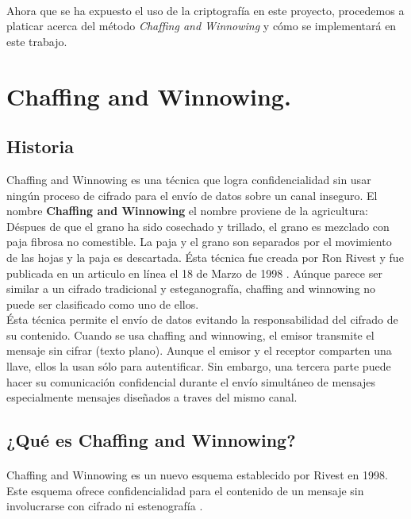\documentclass[12pt, a4paper, titlepage]{report}
\begin{document}
	    \paragraph{}
	    Ahora que se ha expuesto el uso de la criptografía en este proyecto, procedemos a platicar acerca del método \textit{Chaffing and Winnowing} y cómo se implementará en este trabajo.
	   
	    \section{Chaffing and Winnowing.}
	    \subsection{Historia}
	    Chaffing and Winnowing es una técnica que logra confidencialidad sin usar ning\'un proceso de cifrado para el env\'io de datos sobre un canal inseguro. El nombre \textbf{Chaffing and Winnowing} el nombre proviene de la agricultura: D\'espues de que el grano ha sido cosechado y trillado, el grano es mezclado con paja fibrosa no comestible. La paja y el grano son separados por el movimiento de las hojas y la paja es descartada.
	    \'Esta t\'ecnica fue creada por Ron Rivest y fue publicada en un articulo en l\'inea el 18 de Marzo de 1998 \cite{refCryptohraphyWithoutEncryption}.
	    A\'unque parece ser similar a un cifrado tradicional y esteganograf\'ia, chaffing and winnowing no puede ser clasificado como uno de ellos.\\
	    \'Esta t\'ecnica permite el env\'io de datos evitando la responsabilidad del cifrado de su contenido. Cuando se usa chaffing and winnowing, el emisor transmite el mensaje sin cifrar (texto plano). Aunque el emisor y el receptor comparten una llave, ellos la usan s\'olo para autentificar. Sin embargo, una tercera parte puede hacer su comunicaci\'on confidencial durante el env\'io simult\'aneo de mensajes especialmente mensajes diseñados a traves del mismo canal.
	    
	    \subsection{¿Qu\'e es Chaffing and Winnowing?}
	    
	    \paragraph{}
        Chaffing and Winnowing es un nuevo esquema establecido por Rivest en 1998. Este esquema ofrece confidencialidad para el contenido de un mensaje sin involucrarse con cifrado ni estenografía \cite{refCriptografia}.
	    
\end{document}
